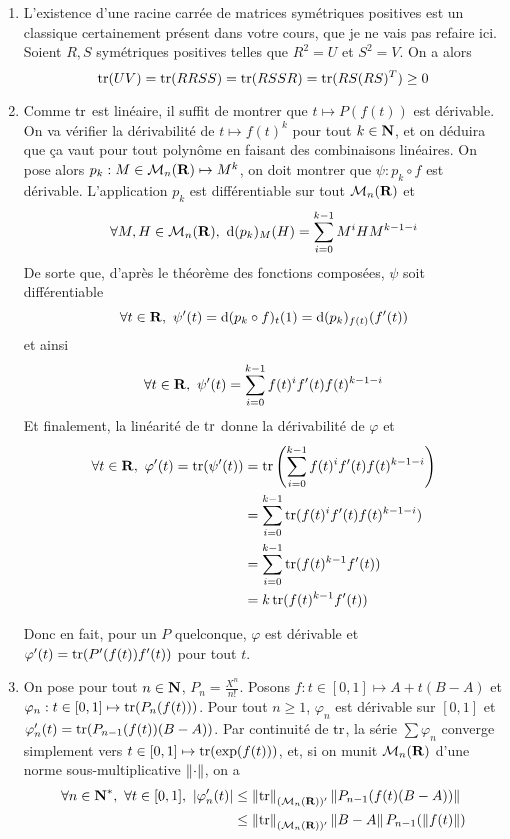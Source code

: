 \begin{correction}
	\begin{enumerate}
		\item L'existence d'une racine carrée de matrices symétriques positives est un classique certainement présent dans votre cours, que je ne vais pas refaire ici. 
		Soient $R,S$ symétriques positives telles que $R^2=U$ et $S^2=V$.
		On a alors 
		\[
			\operatorname{tr}(UV)=\operatorname{tr}(RRSS)=\operatorname{tr}(RSSR)=\operatorname{tr}(RS(RS)^T)\geq 0
		\]
		\item Comme $\operatorname{tr}$ est linéaire, il suffit de montrer que $t\mapsto P(f(t))$ est dérivable.
		On va vérifier la dérivabilité de $t\mapsto f(t)^k$ pour tout $k\in\operatorname{\mathbf{N}}$, et on déduira que ça vaut pour tout polynôme en faisant des combinaisons linéaires.
		On pose alors $p_k:M\in\mathcal M_n(\operatorname{\mathbf{R}})\mapsto M^k$, on doit montrer que $\psi : p_k\circ f$ est dérivable. 
		L'application $p_k$ est différentiable sur tout $\mathcal M_n(\operatorname{\mathbf{R}})$ et 
		\[
			\forall M,H\in\mathcal M_n(\operatorname{\mathbf{R}}),\ \mathrm{d}(p_k)_M(H)=\sum_{i=0}^{k-1}M^iHM^{k-1-i}
		\]
		De sorte que, d'après le théorème des fonctions composées, $\psi$ soit différentiable 
		\[
			\forall t\in\R,\ \psi'(t)=\d(p_k\circ f)_t(1)=\d(p_k)_{f(t)}(f'(t))
		\]
		et ainsi
		\[
			\forall t\in\R,\ \psi'(t)=\sum_{i=0}^{k-1}f(t)^if'(t)f(t)^{k-1-i}	
		\]
		Et finalement, la linéarité de $\operatorname{tr}$ donne la dérivabilité de $\varphi$ et 
		\begin{align*}
			\forall t\in\R,\ \varphi'(t)=\tr(\psi'(t))  &=\tr\left(\sum_{i=0}^{k-1}f(t)^if'(t)f(t)^{k-1-i}\right)\\
														&=\sum_{i=0}^{k-1}\tr(f(t)^if'(t)f(t)^{k-1-i})\\
														&=\sum_{i=0}^{k-1}\tr(f(t)^{k-1}f'(t))\\
														&=k\tr(f(t)^{k-1}f'(t))
		\end{align*}

		Donc en fait, pour un $P$ quelconque, $\varphi$ est dérivable et $\varphi'(t)=\operatorname{tr}(P'(f(t))f'(t))$ pour tout $t$.

		\item On pose pour tout $n\in\operatorname{\mathbf{N}}$, $P_n=\frac{X^n}{n!}$.
		Posons $f:t\in[0,1]\mapsto A + t(B-A)$ et $\varphi_n:t\in[0,1]\mapsto\operatorname{tr}(P_n(f(t)))$.
		Pour tout $n\geq 1$, $\varphi_n$ est dérivable sur $[0,1]$ et $\varphi_n'(t)=\operatorname{tr}(P_{n-1}(f(t))(B-A))$.
		Par continuité de $\operatorname{tr}$, la série $\sum\varphi_n$ converge simplement vers $t\in[0,1]\mapsto\operatorname{tr}(\exp(f(t)))$, et,
		si on munit $\mathcal M_n(\operatorname{\mathbf{R}})$ d'une norme sous-multiplicative $\left\lVert \cdot\right\rVert$, on a 
		\begin{align*}
			\forall n\in\operatorname{\mathbf{N}}^*,\ \forall t\in[0,1],\ |\varphi_n'(t)| &\leq\left\lVert \operatorname{tr}\right\rVert_{(\mathcal M_n(\operatorname{\mathbf{R}}))'}	\left\lVert P_{n-1}(f(t)(B-A))\right\rVert\\
																		&\leq\left\lVert \operatorname{tr}\right\rVert_{(\mathcal M_n(\operatorname{\mathbf{R}}))'}\left\lVert B-A\right\rVert P_{n-1}(\left\lVert f(t)\right\rVert) 
		\end{align*}


\end{enumerate}
\end{correction}

